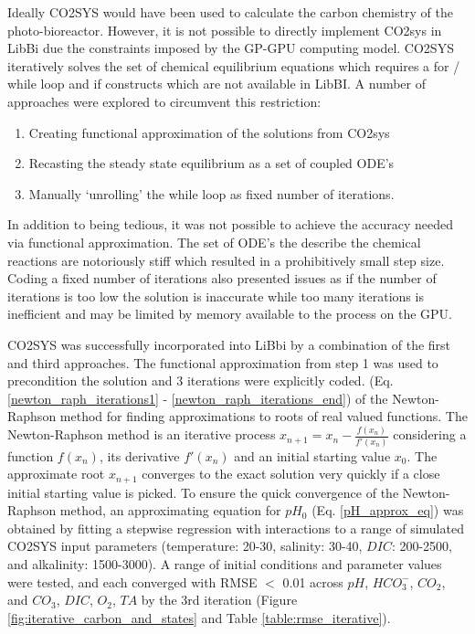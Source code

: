 \documentclass{ruthesis}
\begin{document}
Ideally CO2SYS \cite{lewis1998program} would have been used to calculate the carbon chemistry of the photo-bioreactor. 
However,  it is not possible to directly implement CO2sys in LibBi due the constraints imposed by the GP-GPU computing model.  CO2SYS iteratively solves the set of chemical equilibrium equations which requires a for / while loop and if constructs which are not available in LibBI. 
A number of approaches were explored to circumvent this restriction:
\begin{enumerate}
\item{} Creating functional approximation of the solutions from CO2sys
\item{} Recasting the steady state equilibrium as a set of coupled ODE's 
\item{} Manually `unrolling' the while loop as fixed number of iterations.  
\end{enumerate}

In addition to being tedious, it was not possible to achieve the accuracy needed via functional approximation.   The set of ODE's the describe the chemical reactions are notoriously stiff \cite{zeebe1999time} which resulted in a prohibitively small step size.  Coding a fixed number of iterations also presented issues as if the number of iterations is too low the solution is inaccurate while too many iterations is inefficient and may be limited by memory available to the process on the GPU. 

CO2SYS was successfully incorporated into LiBbi  by a combination of the first and third approaches.  The functional approximation from step 1 was used to precondition the solution and 3 iterations were explicitly coded.  (Eq. \ref{newton_raph_iterations1} - \ref{newton_raph_iterations_end}) of the Newton-Raphson method for finding approximations to roots of real valued functions. The Newton-Raphson method is an iterative process 
$ x_{n+1} = x_n - \frac{f(x_n)}{f'(x_n)} $
considering a function $f(x_n)$, its derivative $f'(x_n)$ and an initial starting value $x_0$. The approximate root $x_{n+1}$ converges to the exact solution very quickly if a close initial starting value is picked. To ensure the quick convergence of the Newton-Raphson method, an approximating equation for $pH_0$ (Eq. \ref{pH_approx_eq}) was obtained by fitting a stepwise regression with interactions to a range of simulated CO2SYS input parameters (temperature: 20-30, salinity: 30-40, $DIC$: 200-2500, and alkalinity: 1500-3000). A range of initial conditions and parameter values were tested, and each converged with RMSE $<$ 0.01 across $pH$, $HCO_3^-$, $CO_2$, and $CO_3$, $DIC$, $O_2$, $TA$ by the 3rd iteration (Figure \ref{fig:iterative_carbon_and_states} and Table \ref{table:rmse_iterative}).
\end{document}
